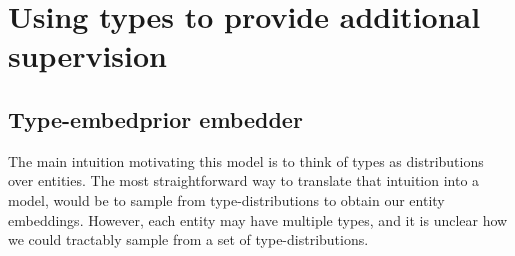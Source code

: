 

\section{Using types to provide additional supervision}
\subsection{Type-embedprior embedder}

The main intuition motivating this model is to think of types as distributions over entities. 
The most straightforward way to translate that intuition into a model, would be to sample from type-distributions to obtain our entity embeddings. 
However, each entity may have multiple types, and it is unclear how we could tractably sample from a set of type-distributions.

